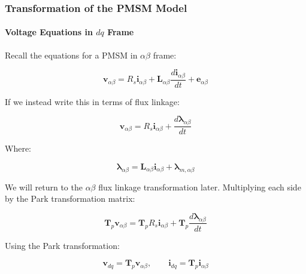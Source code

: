 \documentclass{article}
\begin{document}
\subsubsection{Transformation of the PMSM Model}

\paragraph{Voltage Equations in \texorpdfstring{$dq$}{dq} Frame}


Recall the equations for a PMSM in $\alpha\beta$ frame:

\begin{equation}
    \mathbf{v}_{\alpha\beta}
    =
    R_s\mathbf{i}_{\alpha\beta}
    +
    \mathbf{L}_{\alpha\beta}
    \frac{d\mathbf{i}_{\alpha\beta}}{dt}
    +
    \mathbf{e}_{\alpha\beta}
\end{equation}

If we instead write this in terms of flux linkage:

\begin{equation}
    \mathbf{v}_{\alpha\beta}
    =
    R_s\mathbf{i}_{\alpha\beta}
    +
    \frac{d\boldsymbol{\lambda}_{\alpha\beta}}{dt}
\end{equation}

Where:

\begin{equation}
\label{eqn-alpha-beta-total-flux}
    \boldsymbol{\lambda}_{\alpha\beta} = \mathbf{L}_{\alpha\beta}\mathbf{i}_{\alpha\beta} + \boldsymbol{\lambda}_{m,\alpha\beta}
\end{equation}

We will return to the $\alpha\beta$ flux linkage transformation later. Multiplying each side by the Park transformation matrix:

\begin{equation}
    \mathbf{T}_p\mathbf{v}_{\alpha\beta}
    =
    \mathbf{T}_pR_s\mathbf{i}_{\alpha\beta}
    +
    \mathbf{T}_p\frac{d\boldsymbol{\lambda}_{\alpha\beta}}{dt}
\end{equation}

Using the Park transformation:

\begin{equation}
    \mathbf{v}_{dq} = \mathbf{T}_p\mathbf{v}_{\alpha\beta}, \qquad
    \mathbf{i}_{dq} = \mathbf{T}_p\mathbf{i}_{\alpha\beta}
\end{equation}
\end{document}
